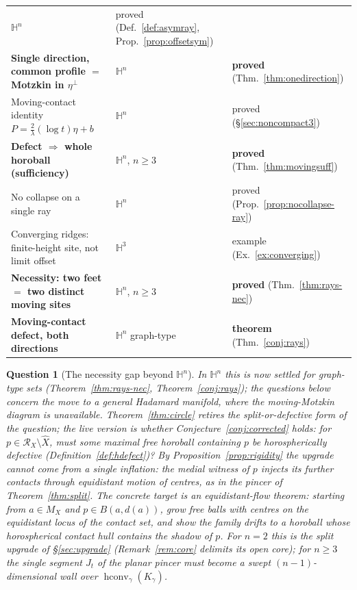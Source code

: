 \documentclass[11pt]{article}
\newtheorem{question}[theorem]{Question}
\theoremstyle{remark}
\newcommand{\X}{X}
\newcommand{\Xhat}{\widehat{\X}}
\newcommand{\Mx}{M_{\X}}
\newcommand{\Rx}{\mathcal{R}_{\X}}
\newcommand{\B}{B}
\begin{document}
\begin{center}
\begin{tabular}{lll}
$\mathbb{H}^{n}$ & proved (Def.~\ref{def:asymray},
Prop.~\ref{prop:offsetsym}) \\
\textbf{Single direction, common profile $=$ Motzkin in $\eta^{\perp}$}
& $\mathbb{H}^{n}$ & \textbf{proved} (Thm.~\ref{thm:onedirection}) \\
Moving-contact identity $P=\frac{2}{\lambda}(\log t)\eta+b$ &
$\mathbb{H}^{n}$ & proved (\S\ref{sec:noncompact3}) \\
\textbf{Defect $\Rightarrow$ whole horoball (sufficiency)} &
$\mathbb{H}^{n}$, $n\ge3$ & \textbf{proved} (Thm.~\ref{thm:movingsuff}) \\
No collapse on a single ray &
$\mathbb{H}^{n}$ & proved (Prop.~\ref{prop:nocollapse-ray}) \\
Converging ridges: finite-height site, not limit offset &
$\mathbb{H}^{3}$ & example (Ex.~\ref{ex:converging}) \\
\textbf{Necessity: two feet $=$ two distinct moving sites} &
$\mathbb{H}^{n}$, $n\ge3$ & \textbf{proved} (Thm.~\ref{thm:rays-nec}) \\
\textbf{Moving-contact defect, both directions} &
$\mathbb{H}^{n}$ graph-type & \textbf{theorem} (Thm.~\ref{conj:rays}) \\
\bottomrule
\end{tabular}
\end{center}

\begin{question}[The necessity gap beyond $\mathbb{H}^{n}$]
\label{q:merge}
In $\mathbb{H}^{n}$ this is now settled for graph-type sets
(Theorem~\ref{thm:rays-nec}, Theorem~\ref{conj:rays}); the questions
below concern the move to a general Hadamard manifold, where the
moving-Motzkin diagram is unavailable. Theorem~\ref{thm:circle} retires
the split-or-defective form of the question; the live version is
whether Conjecture~\ref{conj:corrected} holds: for $p\in\Rx\setminus
\Xhat$, must some maximal free horoball containing $p$ be
horospherically defective (Definition~\ref{def:hdefect})? By
Proposition~\ref{prop:rigidity} the upgrade cannot come from a single
inflation: the medial witness of $p$ injects its further contacts
through equidistant motion of centres, as in the pincer of
Theorem~\ref{thm:split}. The concrete target is an
\emph{equidistant-flow theorem}: starting from $a\in\Mx$ and
$p\in\B(a,d(a))$, grow free balls with centres on the equidistant
locus of the contact set, and show the family drifts to a horoball
whose horospherical contact hull contains the shadow of $p$. For
$n=2$ this is the split upgrade of \S\ref{sec:upgrade}
(Remark~\ref{rem:core} delimits its open core); for $n\ge3$ the
single segment $J_{t}$ of the planar pincer must become a swept
$(n-1)$-dimensional wall over
$\operatorname{hconv}_{\gamma}(K_{\gamma})$.
\end{question}
\end{document}
